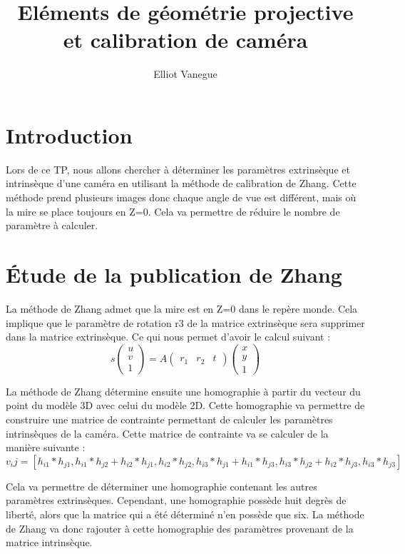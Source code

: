 \documentclass[a4paper,10pt]{article}
\title{Eléments de géométrie projective et calibration de caméra}
\author{Elliot Vanegue}
\begin{document}
\maketitle

\section{Introduction}
Lors de ce TP, nous allons chercher à déterminer les paramètres extrinsèque et 
intrinsèque d'une caméra en utilisant la méthode de calibration de Zhang.
Cette méthode prend plusieurs images donc chaque angle de vue est différent, mais
où la mire se place toujours en Z=0. Cela va permettre de réduire le nombre de paramètre
à calculer.

\section{Étude de la publication de Zhang}
La méthode de Zhang admet que la mire est en Z=0 dans le repère monde. Cela
implique que le paramètre de rotation r3 de la matrice extrinsèque sera supprimer dans la matrice extrinsèque.
Ce qui nous permet d'avoir le calcul suivant : 
$$s\begin{pmatrix}u\\v\\1\end{pmatrix} = A\begin{pmatrix}r_1&r_2&t\end{pmatrix}\begin{pmatrix}x\\y\\1\end{pmatrix}$$

La méthode de Zhang détermine ensuite une homographie à partir du vecteur du point du modèle 3D avec celui
du modèle 2D. Cette homographie va permettre de construire une matrice de contrainte permettant de 
calculer les paramètres intrinsèques de la caméra. Cette matrice de contrainte va se calculer de la manière suivante :
$$v_ij = [h_{i1}*h_{j1}, h_{i1}*h_{j2} + h_{i2}*h_{j1}, h_{i2}*h_{j2}, h_{i3}*h_{j1} + h_{i1}*h_{j3}, h_{i3}*h_{j2} + h_{i2}*h_{j3}, h_{i3}*h_{j3}]$$

Cela va permettre de déterminer une homographie contenant les autres paramètres extrinsèques.
Cependant, une homographie possède huit degrès de liberté, alors que la matrice qui a été déterminé
n'en possède que six. La méthode de Zhang va donc rajouter à cette homographie des paramètres provenant
de la matrice intrinsèque.
\end{document}
